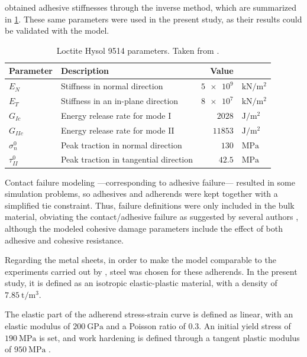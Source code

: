 \documentclass[cmfonts]{witpress}
\begin{document}
\cite{Scattina2011} obtained adhesive stiffnesses through the inverse method, which are summarized in \cref{tab:ads_params}. These same parameters were used in the present study, as their results could be validated with the model.
\begin{table}
	\centering
	\begin{tabular}{llrl}
	\hline
		Parameter & Description & Value & \\
		\hline
		$E_{N}$ & Stiffness in normal direction & $\num{5e9}$ & $\si{\kN/\m^2}$ \\
		$E_{T}$ & Stiffness in an in-plane direction & $\num{8e7}$ & $\si{\kN/\m^2}$ \\
		$G_{Ic}$ & Energy release rate for mode I & $\num{2028}$ & $\si{\J/\m^2}$ \\
		$G_{IIc}$ & Energy release rate for mode II & $\num{11853}$ & $\si{\J/\m^2}$ \\
		$\sigma_{n}^{0}$ & Peak traction in normal direction & $\num{130}$ & $\si{\MPa}$ \\
		$\tau_{II}^{0}$ & Peak traction in tangential direction & $\num{42.5}$ & $\si{\MPa}$ \\
		\hline
	\end{tabular}
	\caption[Loctite Hysol 9514 parameters.]{Loctite Hysol 9514 parameters. Taken from \cite{Scattina2011}.}
	\label{tab:ads_params}
\end{table}

Contact failure modeling ---corresponding to adhesive failure--- resulted in some simulation problems, so adhesives and adherends were kept together with a simplified tie constraint. Thus, failure definitions were only included in the bulk material, obviating the contact/adhesive failure as suggested by several authors \cite{Greve2007, Loureiro2010, Sadowski2010, Sadowski2011, Scattina2011, Sadowski2014, SernaMoreno2015}, although the modeled cohesive damage parameters include the effect of both adhesive and cohesive resistance.

Regarding the metal sheets, in order to make the model comparable to the experiments carried out by \cite{Peroni2009}, steel was chosen for these adherends. In the present study, it is defined as an isotropic elastic-plastic material, with a density of $\SI{7.85}{\tonne/\m^3}$.

The elastic part of the adherend stress-strain curve is defined as linear, with an elastic modulus of $\SI{200}{\GPa}$ and a Poisson ratio of $\num{0.3}$. An initial yield stress of $\SI{190}{\MPa}$ is set, and work hardening is defined through a tangent plastic modulus of $\SI{950}{\MPa}$ \cite{Peroni2009}.
\end{document}
